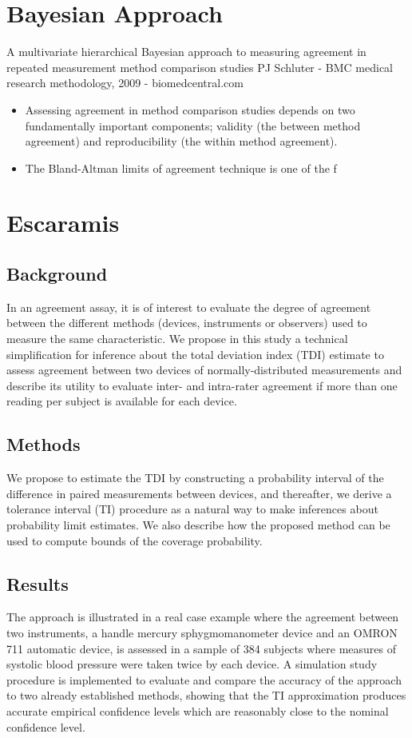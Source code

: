 \documentclass[]{article}
\begin{document}
\section*{Bayesian Approach}
A multivariate hierarchical Bayesian approach to measuring agreement in repeated measurement method comparison studies
PJ Schluter - BMC medical research methodology, 2009 - biomedcentral.com

\begin{itemize}
	\item Assessing agreement in method comparison studies depends on two fundamentally important 
	components; validity (the between method agreement) and reproducibility (the within method 
	agreement). 
	\item The Bland-Altman limits of agreement technique is one of the f
\end{itemize}

\section{Escaramis}
\subsection{Background}
In an agreement assay, it is of interest to evaluate the degree of agreement between the different methods (devices, instruments or observers) used to measure the same characteristic. We propose in this study a technical simplification for inference about the total deviation index (TDI) estimate to assess agreement between two devices of normally-distributed measurements and describe its utility to evaluate inter- and intra-rater agreement if more than one reading per subject is available for each device.

\subsection{Methods}
We propose to estimate the TDI by constructing a probability interval of the difference in paired measurements between devices, and thereafter, we derive a tolerance interval (TI) procedure as a natural way to make inferences about probability limit estimates. We also describe how the proposed method can be used to compute bounds of the coverage probability.

\subsection{Results}
The approach is illustrated in a real case example where the agreement between two instruments, a handle mercury sphygmomanometer device and an OMRON 711 automatic device, is assessed in a sample of 384 subjects where measures of systolic blood pressure were taken twice by each device. A simulation study procedure is implemented to evaluate and compare the accuracy of the approach to two already established methods, showing that the TI approximation produces accurate empirical confidence levels which are reasonably close to the nominal confidence level.
\end{document}
